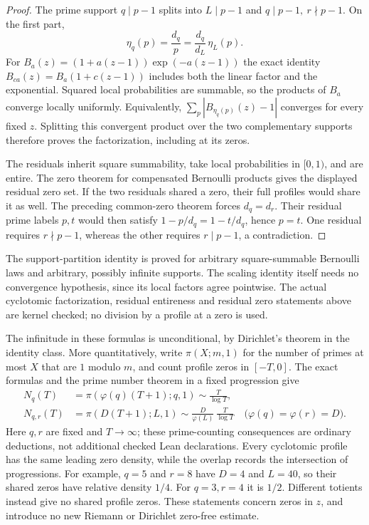 \documentclass[11pt]{article}
\theoremstyle{definition}
\begin{document}
\begin{proof}
The prime support $q\mid p-1$ splits into $L\mid p-1$ and
$q\mid p-1,\ r\nmid p-1$. On the first part,
\[
 \eta_q(p)=\frac{d_q}{p}
         =\frac{d_q}{d_L}\,\eta_L(p).
\]
For $B_a(z)=(1+a(z-1))\exp(-a(z-1))$ the exact identity
$B_{ca}(z)=B_a(1+c(z-1))$ includes both the linear factor and
the exponential. Squared local probabilities are summable, so the
products of $B_a$ converge locally uniformly. Equivalently,
$\sum_p|B_{\eta_q(p)}(z)-1|$ converges for every fixed $z$.
Splitting this convergent product over the two complementary supports
therefore proves the factorization, including at its zeros.

The residuals inherit square summability, take local probabilities
in $[0,1)$, and are entire. The zero theorem for compensated Bernoulli
products gives the displayed residual zero set. If the two residuals
shared a zero, their full profiles would share it as well.
The preceding common-zero theorem forces $d_q=d_r$.
Their residual prime labels $p,t$ would then satisfy
$1-p/d_q=1-t/d_q$, hence $p=t$. One residual requires
$r\nmid p-1$, whereas the other requires $r\mid p-1$,
a contradiction.
\end{proof}

The support-partition identity is proved for arbitrary square-summable
Bernoulli laws and arbitrary, possibly infinite supports. The scaling
identity itself needs no convergence hypothesis, since its local
factors agree pointwise. The actual cyclotomic factorization, residual
entireness and residual zero statements above are kernel checked;
no division by a profile at a zero is used.

The infinitude in these formulas is unconditional, by Dirichlet's
theorem in the identity class. More quantitatively, write
$\pi(X;m,1)$ for the number of primes at most $X$ that are $1$ modulo
$m$, and count profile zeros in $[-T,0]$. The exact formulas and the
prime number theorem in a fixed progression give
\[
 \begin{split}
 N_q(T)&=\pi(\varphi(q)(T+1);q,1)
                \sim \frac{T}{\log T},\\
 N_{q,r}(T)&=\pi(D(T+1);L,1)
                \sim \frac{D}{\varphi(L)}\,\frac{T}{\log T}
       \quad\bigl(\varphi(q)=\varphi(r)=D\bigr).
 \end{split}
\]
Here $q,r$ are fixed and $T\to\infty$; these prime-counting
consequences are ordinary deductions, not additional checked Lean
declarations. Every cyclotomic profile has the same leading zero
density, while the overlap records the intersection of progressions.
For example, $q=5$ and $r=8$ have $D=4$ and $L=40$, so their shared
zeros have relative density $1/4$. For $q=3,r=4$ it is $1/2$.
Different totients instead give no shared profile zeros.
These statements concern zeros in $z$, and introduce no new
Riemann or Dirichlet zero-free estimate.
\end{document}
